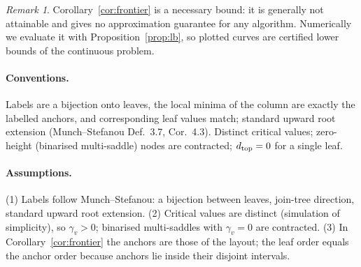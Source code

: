 \documentclass[11pt]{article}
\theoremstyle{remark}\newtheorem{remark}{Remark}
\begin{document}
\begin{remark}Corollary~\ref{cor:frontier} is a necessary bound: it is generally not attainable and gives no approximation guarantee for any algorithm. Numerically we evaluate it with Proposition~\ref{prop:lb}, so plotted curves are certified lower bounds of the continuous problem.\end{remark}
\paragraph{Conventions.} Labels are a bijection onto leaves, the local minima of the column are exactly the labelled anchors, and corresponding leaf values match; standard upward root extension (Munch--Stefanou Def.~3.7, Cor.~4.3). Distinct critical values; zero-height (binarised multi-saddle) nodes are contracted; $d_{\rm top}=0$ for a single leaf.
\paragraph{Assumptions.} (1) Labels follow Munch--Stefanou: a bijection between leaves, join-tree direction, standard upward root extension. (2) Critical values are distinct (simulation of simplicity), so $\gamma_v>0$; binarised multi-saddles with $\gamma_v=0$ are contracted. (3) In Corollary~\ref{cor:frontier} the anchors are those of the layout; the leaf order equals the anchor order because anchors lie inside their disjoint intervals.
\end{document}
